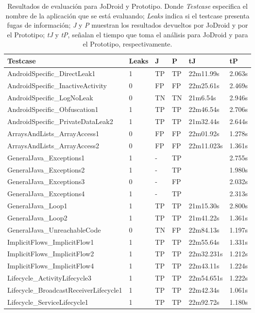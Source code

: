 \label{subsec:jvsp}
\begin{table}[H]
\begin{center}
\small\addtolength{\tabcolsep}{-3pt}
\caption{Resultados de evaluación para JoDroid y Prototipo. Donde
\textit{Testcase} especifica el nombre de la aplicación que se está evaluando;
\textit{Leaks} indica si el testcase presenta fugas de información; \textit{J} y
\textit{P} muestran los resultados devueltos por JoDroid y por el Prototipo;
\textit{tJ} y \textit{tP}, señalan el tiempo que toma el análisis para JoDroid
y para el Prototipo, respectivamente.}
\label{tab:JoDroid-Prototipo}
\begin{tabular}{|p{6cm}|p{1cm}|p{1cm}|p{1cm}|p{}|p{1cm}|}
	\hline
	\textbf{Testcase} & \textbf{Leaks} & \textbf{J} &
	\textbf{P} & \textbf{ tJ} & 
	\textbf{tP}\\
	\hline
	AndroidSpecific\_DirectLeak1 & 1 & TP & TP & 22m11.99s &2.063s\\
	\hline
	AndroidSpecific\_InactiveActivity & 0 & FP & FP  & 22m25.61s &2.469s\\
	\hline
	AndroidSpecific\_LogNoLeak & 0 & TN & TN & 21m6.54s &2.946s\\
	\hline
	AndroidSpecific\_Obfuscation1 & 1 & TP & TP &22m46.54s&2.706s\\
	\hline
	 AndroidSpecific\_PrivateDataLeak2 & 1 & TP & TP &21m32.44s&2.644s\\
	\hline
	 ArraysAndLists\_ArrayAccess1 & 0 & FP & FP &22m01.92s& 1.278s\\
	\hline
	 ArraysAndLists\_ArrayAccess2 & 0 & FP & FP &22m11.023s&1.361s\\
	 \hline
	 GeneralJava\_Exceptions1 & 1 & - & TP &&2.755s\\
	\hline
	 GeneralJava\_Exceptions2 & 1 & - & TP &&1.980s\\
	\hline
	GeneralJava\_Exceptions3 & 0 &  - & FP &&2.032s\\
	\hline
	GeneralJava\_Exceptions4 & 1 & - & TP &&2.313s\\
	\hline
	GeneralJava\_Loop1 & 1 & TP & TP &21m15.30s&2.800s\\
	\hline
	GeneralJava\_Loop2 & 1 & TP & TP &21m41.22s&1.361s\\
	\hline
	GeneralJava\_UnreachableCode & 0 & TN & FP &22m84.13s&1.197s\\
	\hline
	ImplicitFlows\_ImplicitFlow1 & 1 & TP & TP &22m55.64s&1.331s\\
	\hline
	ImplicitFlows\_ImplicitFlow2 & 1 & TP & TP &22m32.231s&1.212s\\
	\hline
	ImplicitFlows\_ImplicitFlow4 & 1 & TP & TP &22m43.11s&1.224s\\
	\hline
	Lifecycle\_ActivityLifecycle3 & 1 & TP & TP &22m54.651s&1.222s\\
	\hline
	Lifecycle\_BroadcastReceiverLifecycle1 & 1 & TP & TP &22m42.34s&1.061s\\
	\hline
	Lifecycle\_ServiceLifecycle1 & 1 & TP & TP &22m92.72s&1.180s\\
	\hline
\end{tabular}
\end{center}
\end{table}

